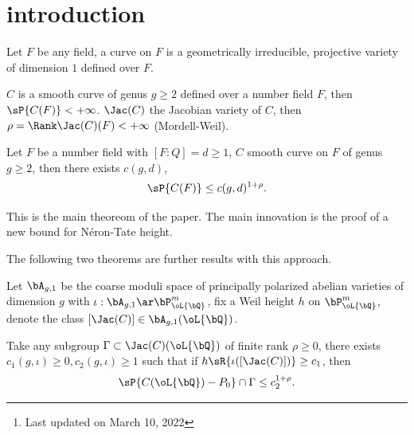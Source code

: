 

\title{}
\author{ by Cong Wen, 03/2022}
\date{}


\maketitle
\thispagestyle{empty}
\begin{abstract}
  This is my self-use notes\footnote{Last updated on March 10, 2022} on \cite{DGH2021}. Please reach out if you find anything incorrect.
\end{abstract}
\tableofcontents




\section{introduction}
\begin{stp}
  Let $F$ be any field, a curve on $F$ is a geometrically irreducible, projective variety of dimension $1$ defined over $F$.

  $C$ is a smooth curve of genus $g\geq 2$ defined over a number field $F$, then $\sP{C(F)}<+\infty$\cite{Faltings1983}. $\Jac(C)$ the Jacobian variety of $C$, then $\rho=\Rank\Jac(C)(F)<+\infty$ (Mordell-Weil).
\end{stp}

\begin{thm}
  Let $F$ be a number field with $[F:Q]=d\geq 1$, $C$ smooth curve on $F$ of genus $g\geq 2$, then there exists $c(g,d)$,
  \[
    \sP{C(F)}\leq c(g,d)^{1+\rho}.
  \]
\end{thm}
\begin{rmk}
  This is the main theoreom of the paper. The main innovation is the proof of a new bound for N{\'e}ron-Tate height.

  The following two theorems are further results with this approach.
\end{rmk}


\begin{stp}
  Let $\bA_{g,1}$ be the coarse moduli space of principally polarized abelian varieties of dimension $g$ with $\iota:\bA_{g,1}\ar\bP_{\oL{\bQ}}^{m}$, fix a Weil height $h$ on $\bP_{\oL{\bQ}}^{m}$, denote the class $[\Jac(C)]\in\bA_{g,1}(\oL{\bQ})$.
\end{stp}

\begin{thm}
  Take any subgroup $\Gamma\subset\Jac(C)(\oL{\bQ})$ of finite rank $\rho\geq 0$, there exists $c_{1}(g,\iota)\geq 0, c_{2}(g,\iota)\geq 1$ such that if $h\sR{\iota([\Jac(C)])}\geq c_{1}$, then
  \[
    \sP{C(\oL{\bQ})-P_{0}}\cap\Gamma\leq c_{2}^{1+\rho}.
  \]
\end{thm}

